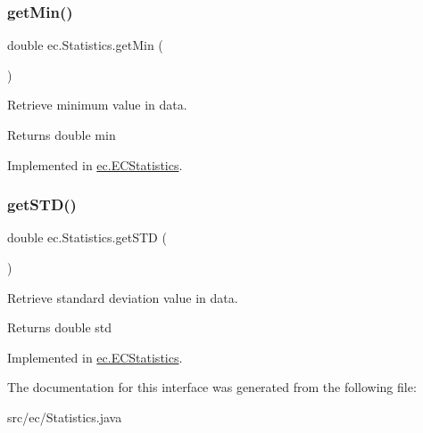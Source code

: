 \subsubsection{\texorpdfstring{get\+Min()}{getMin()}}
{\footnotesize\ttfamily double ec.\+Statistics.\+get\+Min (\begin{DoxyParamCaption}{ }\end{DoxyParamCaption})}



Retrieve minimum value in data. 

\begin{DoxyReturn}{Returns}
double min 
\end{DoxyReturn}


Implemented in \hyperlink{classec_1_1_e_c_statistics_a2e37a5bd92ed681173461776f562375e}{ec.\+E\+C\+Statistics}.

\mbox{\label{interfaceec_1_1_statistics_a51643b39410b478bc996068eeb48ca0d}} 
\subsubsection{\texorpdfstring{get\+S\+T\+D()}{getSTD()}}
{\footnotesize\ttfamily double ec.\+Statistics.\+get\+S\+TD (\begin{DoxyParamCaption}{ }\end{DoxyParamCaption})}



Retrieve standard deviation value in data. 

\begin{DoxyReturn}{Returns}
double std 
\end{DoxyReturn}


Implemented in \hyperlink{classec_1_1_e_c_statistics_a62cb7d1e5f86a179c68cc8a9c450b835}{ec.\+E\+C\+Statistics}.



The documentation for this interface was generated from the following file\+:\begin{DoxyCompactItemize}
\item 
src/ec/Statistics.\+java\end{DoxyCompactItemize}
